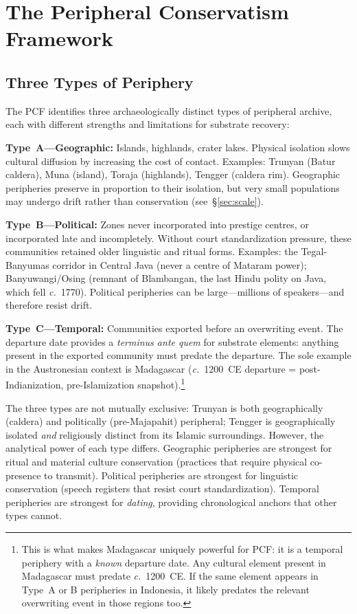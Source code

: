 \documentclass[12pt,a4paper]{article}
\begin{document}
\section{The Peripheral Conservatism Framework}
\label{sec:pcf}

\subsection{Three Types of Periphery}

The PCF identifies three archaeologically distinct types of peripheral archive, each with different strengths and limitations for substrate recovery:

\textbf{Type~A---Geographic:} Islands, highlands, crater lakes. Physical isolation slows cultural diffusion by increasing the cost of contact. Examples: Trunyan (Batur caldera), Muna (island), Toraja (highlands), Tengger (caldera rim). Geographic peripheries preserve in proportion to their isolation, but very small populations may undergo drift rather than conservation (see~\S\ref{sec:scale}).

\textbf{Type~B---Political:} Zones never incorporated into prestige centres, or incorporated late and incompletely. Without court standardization pressure, these communities retained older linguistic and ritual forms. Examples: the Tegal-Banyumas corridor in Central Java (never a centre of Mataram power); Banyuwangi/Osing (remnant of Blambangan, the last Hindu polity on Java, which fell \textit{c.}~1770). Political peripheries can be large---millions of speakers---and therefore resist drift.

\textbf{Type~C---Temporal:} Communities exported before an overwriting event. The departure date provides a \emph{terminus ante quem} for substrate elements: anything present in the exported community must predate the departure. The sole example in the Austronesian context is Madagascar (\textit{c.}~1200~CE departure = post-Indianization, pre-Islamization snapshot).\footnote{This is what makes Madagascar uniquely powerful for PCF: it is a temporal periphery with a \emph{known} departure date. Any cultural element present in Madagascar must predate \textit{c.}~1200~CE. If the same element appears in Type~A or B peripheries in Indonesia, it likely predates the relevant overwriting event in those regions too.}

The three types are not mutually exclusive: Trunyan is both geographically (caldera) and politically (pre-Majapahit) peripheral; Tengger is geographically isolated \emph{and} religiously distinct from its Islamic surroundings. However, the analytical power of each type differs. Geographic peripheries are strongest for ritual and material culture conservation (practices that require physical co-presence to transmit). Political peripheries are strongest for linguistic conservation (speech registers that resist court standardization). Temporal peripheries are strongest for \emph{dating}, providing chronological anchors that other types cannot.
\end{document}
